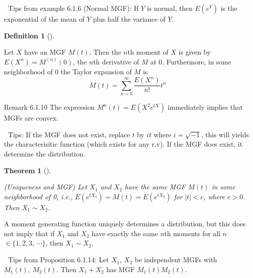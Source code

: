 \documentclass[
  letterpaper,
  DIV=11,
  numbers=noendperiod]{scrreprt}
\theoremstyle{definition}
\newtheorem{definition}{Definition}[chapter]
\theoremstyle{plain}
\newtheorem{theorem}{Theorem}[chapter]
\theoremstyle{remark}
\begin{document}
💌 Tips from example 6.1.6 (Normal MGF): If \(Y\) is normal, then
\(E(e^Y)\) is the exponential of the mean of \(Y\) plus half the
variance of \(Y\).

\leavevmode{}%
\begin{definition}[]\label{def-n-th-moment}

Let \(\displaystyle X\) have an MGF \(\displaystyle M( t)\). Then the
\(\displaystyle n\)th moment of \(\displaystyle X\) is given by
\(\displaystyle E\left( X^{n}\right) =M^{( n)}( 0)\), the
\(\displaystyle n\)th derivative of \(\displaystyle M\) at
\(\displaystyle 0\). Furthermore, in some neighborhood of
\(\displaystyle 0\) the Taylor expansion of \(\displaystyle M\) is
\begin{equation*}
M( t) =\sum _{n=0}^{\infty }\frac{E\left( X^{n}\right)}{n!} t^{n}
\end{equation*}

\end{definition}

Remark 6.1.10 The expression
\(\displaystyle M^{n}( t) =E\left( X^{2} e^{tX}\right)\) immediately
implies that MGFs are convex.

💌 Tips: If the MGF does not exist, replace \(\displaystyle t\) by
\(\displaystyle it\) where \(\displaystyle i=\sqrt{-1}\), this will
yields the characterisitic function (which exists for any r.v). If the
MGF does exist, it determine the distribution.

\leavevmode{}%
\begin{theorem}[]\label{thm-linearity}

(Uniqueness and MGF) Let \(\displaystyle X_{1}\) and
\(\displaystyle X_{2}\) have the same MGF \(\displaystyle M( t)\) in
some neighborhood of 0, i.e.,
\(\displaystyle E\left( e^{tX_{1}}\right) =M( t) =E\left( e^{tX_{2}}\right)\)
for \(\displaystyle |t|< c\), where \(\displaystyle c >0\). Then
\(\displaystyle X_{1} \sim X_{2}\).

\end{theorem}

A moment generating function uniquely determines a distribution, but
this does not imply that if \(\displaystyle X_{1}\) and
\(\displaystyle X_{2}\) have exactly the same \(\displaystyle n\)th
moments for all
\(\displaystyle n\)\(\displaystyle \in \{1,2,3,\ \cdots \}\), then
\(\displaystyle X_{1} \sim X_{2} .\)

💌 Tips from Proposition 6.1.14: Let \(\displaystyle X_{1}\),
\(\displaystyle X_{2}\) be independent MGFs with
\(\displaystyle M_{1}( t) ,\ M_{2}( t)\). Then
\(\displaystyle X_{1} +X_{2}\) has MGF
\(\displaystyle M_{1}( t) M_{2}( t)\).
\end{document}
